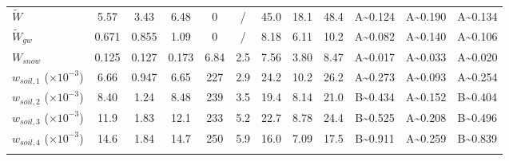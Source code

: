 \documentclass[essd, manuscript]{copernicus}
\begin{document}
\begin{table}[t]
\begin{tabular}{lccccccccccc}
    \(\tilde{W}\)                       & \num{5.57}                                             & \num{3.43}                                              & \num{6.48}                 & \num{0}        & /         & \num{45.0}  & \num{18.1}  & \num{48.4}  & A\textasciitilde\num{0.124} & A\textasciitilde\num{0.190} & A\textasciitilde\num{0.134} \\
    \(\tilde{W}_{gw}\)                  & \num{0.671}                                            & \num{0.855}                                             & \num{1.09}                 & \num{0}        & /         & \num{8.18}  & \num{6.11}  & \num{10.2}  & A\textasciitilde\num{0.082} & A\textasciitilde\num{0.140} & A\textasciitilde\num{0.106} \\
    \(W_{snow}\)                        & \num{0.125}                                            & \num{0.127}                                             & \num{0.173}                & \num{6.84}     & \num{2.5} & \num{7.56}  & \num{3.80}  & \num{8.47}  & A\textasciitilde\num{0.017} & A\textasciitilde\num{0.033} & A\textasciitilde\num{0.020} \\
    \(w_{soil,1}\) (\(\times 10^{-3}\)) & \num{6.66}                                             & \num{0.947}                                             & \num{6.65}                 & \num{227}      & \num{2.9} & \num{24.2}  & \num{10.2}  & \num{26.2}  & A\textasciitilde\num{0.273} & A\textasciitilde\num{0.093} & A\textasciitilde\num{0.254} \\
    \(w_{soil,2}\) (\(\times 10^{-3}\)) & \num{8.40}                                             & \num{1.24}                                              & \num{8.48}                 & \num{239}      & \num{3.5} & \num{19.4}  & \num{8.14}  & \num{21.0}  & B\textasciitilde\num{0.434} & A\textasciitilde\num{0.152} & B\textasciitilde\num{0.404} \\
    \(w_{soil,3}\) (\(\times 10^{-3}\)) & \num{11.9}                                             & \num{1.83}                                              & \num{12.1}                 & \num{233}      & \num{5.2} & \num{22.7}  & \num{8.78}  & \num{24.4}  & B\textasciitilde\num{0.525} & A\textasciitilde\num{0.208} & B\textasciitilde\num{0.496} \\
    \(w_{soil,4}\) (\(\times 10^{-3}\)) & \num{14.6}                                             & \num{1.84}                                              & \num{14.7}                 & \num{250}      & \num{5.9} & \num{16.0}  & \num{7.09}  & \num{17.5}  & B\textasciitilde\num{0.911} & A\textasciitilde\num{0.259} & B\textasciitilde\num{0.839} \\
    \bottomhline
  \end{tabular}

\end{table}
\end{document}
